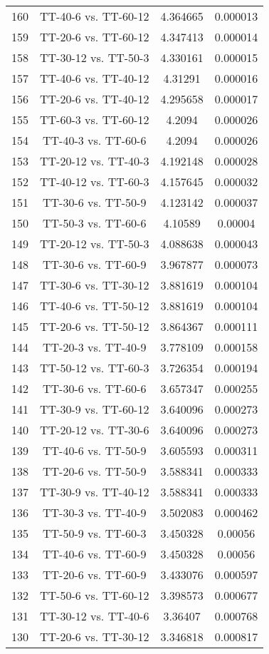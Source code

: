 \documentclass[a4paper,10pt]{article}
\begin{document}
\begin{landscape}
\begin{table}[!htp]
\begin{tabular}{cccc}
160&TT-40-6 vs. TT-60-12&4.364665&0.000013\\
159&TT-20-6 vs. TT-60-12&4.347413&0.000014\\
158&TT-30-12 vs. TT-50-3&4.330161&0.000015\\
157&TT-40-6 vs. TT-40-12&4.31291&0.000016\\
156&TT-20-6 vs. TT-40-12&4.295658&0.000017\\
155&TT-60-3 vs. TT-60-12&4.2094&0.000026\\
154&TT-40-3 vs. TT-60-6&4.2094&0.000026\\
153&TT-20-12 vs. TT-40-3&4.192148&0.000028\\
152&TT-40-12 vs. TT-60-3&4.157645&0.000032\\
151&TT-30-6 vs. TT-50-9&4.123142&0.000037\\
150&TT-50-3 vs. TT-60-6&4.10589&0.00004\\
149&TT-20-12 vs. TT-50-3&4.088638&0.000043\\
148&TT-30-6 vs. TT-60-9&3.967877&0.000073\\
147&TT-30-6 vs. TT-30-12&3.881619&0.000104\\
146&TT-40-6 vs. TT-50-12&3.881619&0.000104\\
145&TT-20-6 vs. TT-50-12&3.864367&0.000111\\
144&TT-20-3 vs. TT-40-9&3.778109&0.000158\\
143&TT-50-12 vs. TT-60-3&3.726354&0.000194\\
142&TT-30-6 vs. TT-60-6&3.657347&0.000255\\
141&TT-30-9 vs. TT-60-12&3.640096&0.000273\\
140&TT-20-12 vs. TT-30-6&3.640096&0.000273\\
139&TT-40-6 vs. TT-50-9&3.605593&0.000311\\
138&TT-20-6 vs. TT-50-9&3.588341&0.000333\\
137&TT-30-9 vs. TT-40-12&3.588341&0.000333\\
136&TT-30-3 vs. TT-40-9&3.502083&0.000462\\
135&TT-50-9 vs. TT-60-3&3.450328&0.00056\\
134&TT-40-6 vs. TT-60-9&3.450328&0.00056\\
133&TT-20-6 vs. TT-60-9&3.433076&0.000597\\
132&TT-50-6 vs. TT-60-12&3.398573&0.000677\\
131&TT-30-12 vs. TT-40-6&3.36407&0.000768\\
130&TT-20-6 vs. TT-30-12&3.346818&0.000817\\

\end{tabular}
\end{table}
\end{landscape}
\end{document}
